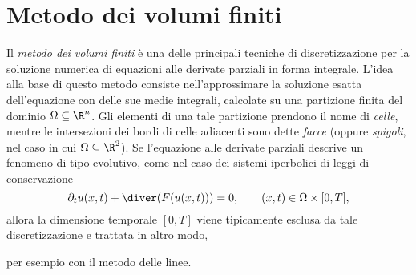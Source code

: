 %  
%  
%  

\chapter{Metodo dei volumi finiti}

Il \emph{metodo dei volumi finiti} è una delle principali
tecniche di discretizzazione per la soluzione numerica di equazioni
alle derivate parziali in forma integrale.
L'idea alla base di questo metodo consiste nell'approssimare
la soluzione esatta dell'equazione con delle sue medie integrali,
calcolate su una partizione finita del dominio $\Omega \subseteq \R^n$.
Gli elementi di una tale partizione prendono il nome di \emph{celle},
mentre le intersezioni dei bordi di celle adiacenti sono dette \emph{facce}
(oppure \emph{spigoli}, nel caso in cui $\Omega \subseteq \R^2$).
Se l'equazione alle derivate parziali descrive un fenomeno di tipo
evolutivo, come nel caso dei sistemi iperbolici di leggi
di conservazione
\[
\partial_t u(x,t) + \diver(F(u(x,t))) = 0,
\qquad (x,t) \in \Omega \times [0,T],
\]
allora la dimensione temporale $[0,T]$ viene tipicamente esclusa
da tale discretizzazione e trattata in altro modo,

per esempio con il metodo delle linee.

